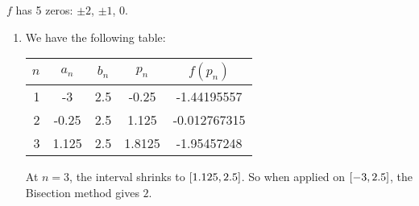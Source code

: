 \documentclass[../../Assignments.tex]{subfiles}
\begin{document}
\begin{solution}
    \(f\) has 5 zeros: \(\pm 2\), \(\pm 1\), \(0\).

    \begin{enumerate}[label = (\alph*)]
        \item We have the following table:


            \begin{table}[H]
                \centering
                \begin{tabular}{r S[table-format=-1.3] S[table-format=1.1] S[table-format=-1.4] S[table-format=-1.9]}
                    \toprule
                    \(n\)  &   {\(a_n\)}   &   {\(b_n\)}   &   {\(p_n\)}   &  {\(f(p_n)\)}  \\
                      &  -3           &  2.5          &  -0.25        &  -1.44195557   \\
                        2  &  -0.25        &  2.5          &   1.125       &  -0.012767315  \\
                        3  &   1.125       &  2.5          &   1.8125      &  -1.95457248   \\
                    \bottomrule
                \end{tabular}
            \end{table}

            At \(n = 3\), the interval shrinks to
            \(\interval{\num{1.125}}{\num{2.5}}\). So when applied on
            \(\interval{-3}{\num{2.5}}\), the Bisection method gives \(2\).


\end{enumerate}
\end{solution}
\end{document}
